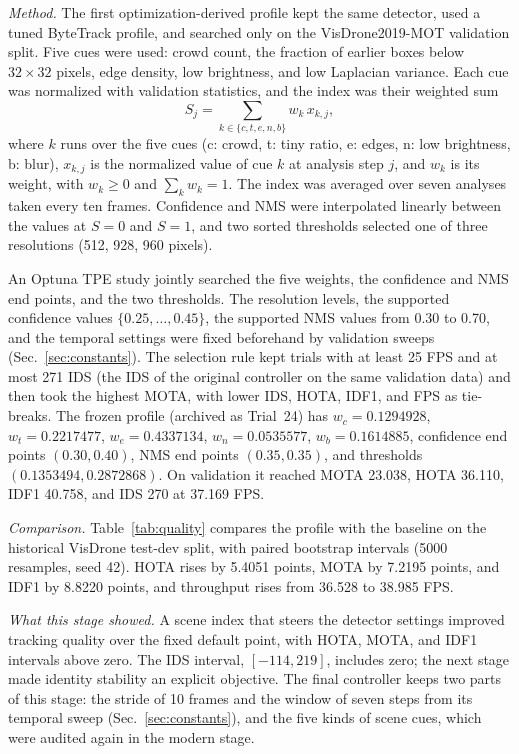 \documentclass[journal]{new-aiaa}
\begin{document}
\emph{Method.} The first optimization-derived profile kept the same detector,
used a tuned ByteTrack profile, and searched only on the VisDrone2019-MOT
validation split. Five cues were used: crowd count, the fraction of earlier
boxes below $32\times32$ pixels, edge density, low brightness, and low
Laplacian variance. Each cue was normalized with validation statistics, and
the index was their weighted sum
\begin{equation}
S_j=\sum_{k\in\{c,t,e,n,b\}}w_k\,x_{k,j},
\label{eq:hist-sci}
\end{equation}
where $k$ runs over the five cues (c: crowd, t: tiny ratio, e: edges, n: low
brightness, b: blur), $x_{k,j}$ is the normalized value of cue $k$ at analysis
step $j$, and $w_k$ is its weight, with $w_k\geq0$ and $\sum_k w_k=1$. The
index was averaged over seven analyses taken every ten frames. Confidence and NMS were interpolated linearly between the values
at $S=0$ and $S=1$, and two sorted thresholds selected one of three
resolutions (512, 928, 960 pixels).

An Optuna TPE study \cite{akiba2019optuna} jointly searched the five weights,
the confidence and NMS end points, and the two thresholds. The resolution
levels, the supported confidence values $\{0.25,\dots,0.45\}$, the supported
NMS values from 0.30 to 0.70, and the temporal settings were fixed beforehand
by validation sweeps (Sec.~\ref{sec:constants}). The selection rule kept
trials with at least 25 FPS and at most 271 IDS (the IDS of the original
controller on the same validation data) and then took the highest MOTA, with lower IDS, HOTA,
IDF1, and FPS as tie-breaks. The frozen profile (archived as Trial~24) has
$w_c=0.1294928$, $w_t=0.2217477$, $w_e=0.4337134$, $w_n=0.0535577$,
$w_b=0.1614885$, confidence end points $(0.30,0.40)$, NMS end points
$(0.35,0.35)$, and thresholds $(0.1353494, 0.2872868)$. On validation it
reached MOTA 23.038, HOTA 36.110, IDF1 40.758, and IDS 270 at 37.169 FPS.

\emph{Comparison.} Table~\ref{tab:quality} compares the profile with the
baseline on the historical VisDrone test-dev split, with paired bootstrap
intervals (5000 resamples, seed 42). HOTA rises by 5.4051 points, MOTA by
7.2195 points, and IDF1 by 8.8220 points, and throughput rises from 36.528 to
38.985 FPS.

\emph{What this stage showed.} A scene index that steers the detector settings
improved tracking quality over the fixed default point, with HOTA, MOTA, and
IDF1 intervals above zero. The IDS interval, $[-114, 219]$, includes zero; the
next stage made identity stability an explicit objective. The final
controller keeps two parts of this stage: the stride of 10 frames and the
window of seven steps from its temporal sweep (Sec.~\ref{sec:constants}), and
the five kinds of scene cues, which were audited again in the modern stage.
\end{document}
